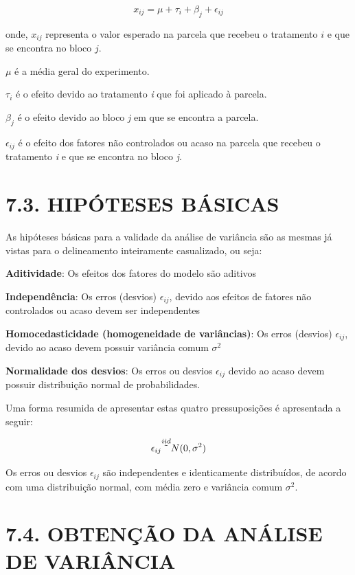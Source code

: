 \documentclass[
]{book}
\begin{document}
\[
x_{ij} = \mu +\tau_i + \beta_j+\epsilon_{ij}
\]

onde,
\(x_{ij}\) representa o valor esperado na parcela que recebeu o tratamento \(i\) e que se encontra no bloco \(j\).

\(\mu\) é a média geral do experimento.

\(\tau_i\) é o efeito devido ao tratamento \emph{i} que foi aplicado à parcela.

\(\beta_j\) é o efeito devido ao bloco \emph{j} em que se encontra a parcela.

\(\epsilon_{ij}\) é o efeito dos fatores não controlados ou acaso na parcela que recebeu o tratamento \emph{i} e que se encontra no bloco \emph{j}.

\hypertarget{hipuxf3teses-buxe1sicas}{%
\section{7.3. HIPÓTESES BÁSICAS}\label{hipuxf3teses-buxe1sicas}}

As hipóteses básicas para a validade da análise de variância são as mesmas já vistas para o delineamento inteiramente casualizado, ou seja:

\textbf{Aditividade}: Os efeitos dos fatores do modelo são aditivos

\textbf{Independência}: Os erros (desvios) \(\epsilon_{ij}\), devido aos efeitos de fatores não controlados ou acaso devem ser independentes

\textbf{Homocedasticidade (homogeneidade de variâncias)}: Os erros (desvios) \(\epsilon_{ij}\), devido ao acaso devem possuir variância comum \(\sigma^2\)

\textbf{Normalidade dos desvios}: Os erros ou desvios \(\epsilon_{ij}\) devido ao acaso devem possuir distribuição normal de probabilidades.

Uma forma resumida de apresentar estas quatro pressuposições é apresentada a seguir:

\[
\epsilon_{ij} \overset{iid}{\tilde{}} N(0,\sigma^2) \\
\]

Os erros ou desvios \(\epsilon_{ij}\) são independentes e identicamente distribuídos, de acordo com uma distribuição normal, com média zero e variância comum \(\sigma^2\).

\hypertarget{obtenuxe7uxe3o-da-anuxe1lise-de-variuxe2ncia}{%
\section{7.4. OBTENÇÃO DA ANÁLISE DE VARIÂNCIA}\label{obtenuxe7uxe3o-da-anuxe1lise-de-variuxe2ncia}}
\end{document}

